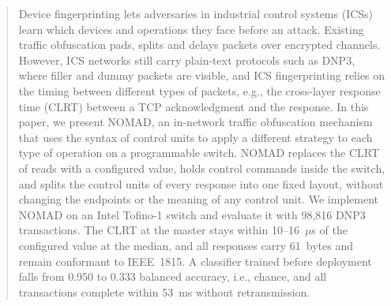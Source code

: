 \begin{abstract}
Device fingerprinting lets adversaries in industrial control systems (ICSs) learn which devices and operations they face before an attack. Existing traffic obfuscation pads, splits and delays packets over encrypted channels. However, ICS networks still carry plain-text protocols such as DNP3, where filler and dummy packets are visible, and ICS fingerprinting relies on the timing between different types of packets, e.g., the cross-layer response time (CLRT) between a TCP acknowledgment and the response. In this paper, we present NOMAD, an in-network traffic obfuscation mechanism that uses the syntax of control units to apply a different strategy to each type of operation on a programmable switch. NOMAD replaces the CLRT of reads with a configured value, holds control commands inside the switch, and splits the control units of every response into one fixed layout, without changing the endpoints or the meaning of any control unit. We implement NOMAD on an Intel Tofino-1 switch and evaluate it with 98,816 DNP3 transactions. The CLRT at the master stays within 10--16~$\mu$s of the configured value at the median, and all responses carry 61~bytes and remain conformant to IEEE~1815. A classifier trained before deployment falls from 0.950 to 0.333 balanced accuracy, i.e., chance, and all transactions complete within 53~ms without retransmission.
\end{abstract}
